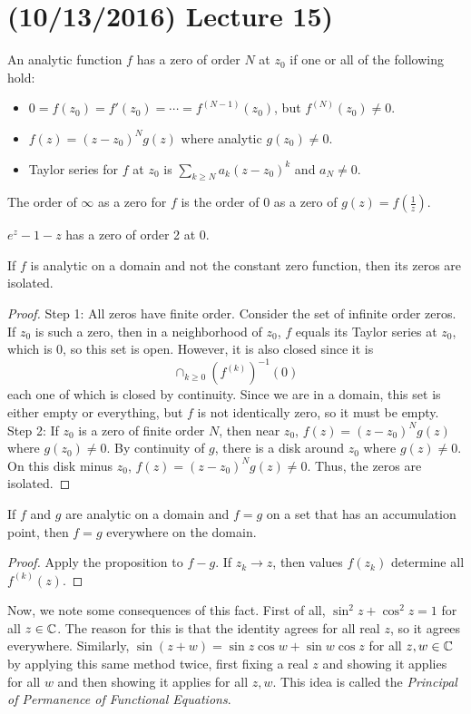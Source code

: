 \documentclass[11pt,leqno,oneside]{amsart}
\numberwithin{thm}{section}
\begin{document}
  \section{(10/13/2016) Lecture 15)}
  \begin{defn}
    An analytic function $f$ has a zero of order $N$ at $z_0$ if one
    or all of the following hold:
    \begin{itemize}
    \item $0 = f(z_0) = f'(z_0) = \cdots = f^{(N-1)}(z_0)$, but
      $f^{(N)}(z_0) \neq 0$.
    \item $f(z) = (z-z_0)^N g(z)$ where analytic $g(z_0) \neq 0$.
    \item Taylor series for $f$ at $z_0$ is $\sum_{k \geq N}
      a_k(z-z_0)^k$ and $a_N \neq 0$.
    \end{itemize}
    The order of $\infty$ as a zero for $f$ is the order of 0 as a  zero
    of $g(z) = f(\frac{1}{z})$.
  \end{defn}
  \begin{example}
    $e^z-1-z$ has a zero of order 2 at 0.
  \end{example}
  \begin{prop}
    If $f$ is analytic on a domain and not the constant zero function,
    then its zeros are isolated.
  \end{prop}
  \begin{proof}
    Step 1: All zeros have finite order. Consider the set of infinite
    order zeros. If $z_0$ is such a zero, then in a neighborhood of
    $z_0$, $f$ equals its Taylor series at $z_0$, which is 0, so this
    set is open. However, it is also closed since it is \[
      \cap_{k \geq 0} (f^{(k)})^{-1}(0)
    \]
    each one of which is closed by continuity. Since we are in a
    domain, this set is either empty or everything, but $f$ is not
    identically zero, so it must be empty.\\
    Step 2: If $z_0$ is a zero of finite order $N$, then near $z_0$,
    $f(z) = (z-z_0)^N g(z)$ where $g(z_0) \neq 0$. By continuity of $g$,
    there is a disk around $z_0$ where $g(z) \neq 0$. On this disk
    minus $z_0$, $f(z) = (z-z_0)^N g(z) \neq 0$. Thus, the zeros are
    isolated.
  \end{proof}
  \begin{cor}
    If $f$ and $g$ are analytic on a domain and $f=g$ on a set that
    has an accumulation point, then $f=g$ everywhere on the domain.
  \end{cor}
  \begin{proof}
    Apply the proposition to $f-g$. If $z_k \to z$, then values
    $f(z_k)$ determine all $f^{(k)}(z)$.
  \end{proof}
  Now, we note some consequences of this fact. First of all, $\sin^2 z
  + \cos^2 z = 1$ for all $z \in {\mathbb C}$. The reason for this is that the
  identity agrees for all real $z$, so it agrees
  everywhere. Similarly, $\sin(z+w) = \sin z \cos w + \sin w \cos z$
  for all $z,w \in {\mathbb C}$ by applying this same method twice, first
  fixing a real $z$ and showing it applies for all $w$ and then
  showing it applies for all $z,w$. This idea is called the
  \emph{Principal of Permanence of Functional Equations}.
\end{document}
